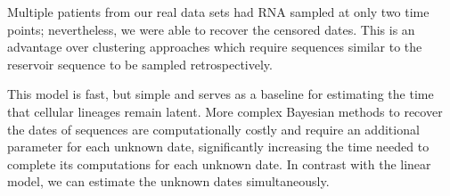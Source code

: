 \documentclass[12pt]{article}
\begin{document}





Multiple patients from our real data sets had RNA sampled at only two time points; nevertheless, we were able to recover the censored dates.
This is an advantage over clustering approaches \cite{Buzon14} which require sequences similar to the reservoir sequence to be sampled retrospectively.

This model is fast, but simple and serves as a baseline for estimating the time that cellular lineages remain latent.
More complex Bayesian methods \cite{Shapiro11} to recover the dates of sequences are computationally costly and require an additional parameter for each unknown date, significantly increasing the time needed to complete its computations for each unknown date.
In contrast with the linear model, we can estimate the unknown dates simultaneously.
\end{document}
